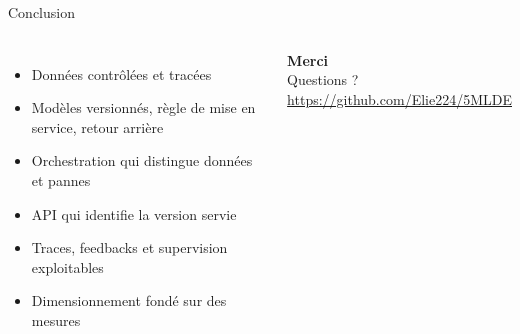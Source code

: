 \documentclass[aspectratio=169,11pt]{beamer}
\begin{document}
\begin{frame}{Conclusion}
\begin{columns}[c]
\begin{itemize}
  \item Données \alert{contrôlées} et tracées
  \item Modèles \alert{versionnés}, règle de mise en service, retour arrière
  \item Orchestration qui distingue données et pannes
  \item API qui \alert{identifie} la version servie
  \item Traces, feedbacks et supervision exploitables
  \item Dimensionnement \alert{fondé sur des mesures}
\end{itemize}
\centering
{\Large\bfseries\color{bleu}Merci}\\[8pt]
{\color{gris}Questions ?}\\[14pt]
\scriptsize\url{https://github.com/Elie224/5MLDE}
\end{columns}
\end{frame}
\end{document}
